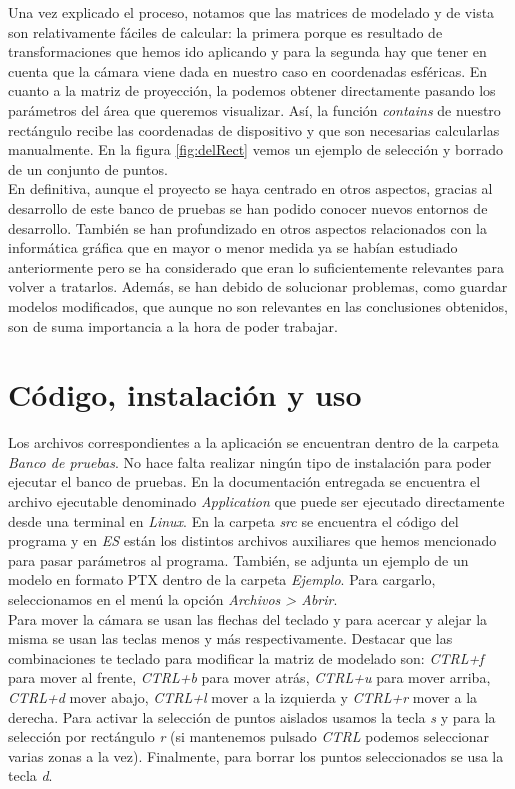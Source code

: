 Una vez explicado el proceso, notamos que las matrices de modelado y de vista son relativamente fáciles de calcular: la primera porque es resultado de transformaciones que hemos ido aplicando y para la segunda hay que tener en cuenta que la cámara viene dada en nuestro caso en coordenadas esféricas. En cuanto a la matriz de proyección, la podemos obtener directamente pasando los parámetros del área que queremos visualizar. Así, la función \textit{contains} de nuestro rectángulo recibe las coordenadas de dispositivo y que son necesarias calcularlas manualmente. En la figura \ref{fig:delRect} vemos un ejemplo de selección y borrado de un conjunto de puntos. \\

En definitiva, aunque el proyecto se haya centrado en otros aspectos, gracias al desarrollo de este banco de pruebas se han podido conocer nuevos entornos de desarrollo. También se han profundizado en otros aspectos relacionados con la informática  gráfica que en mayor o menor medida ya se habían estudiado anteriormente pero se ha considerado que eran lo suficientemente relevantes para volver a tratarlos. Además, se han debido de solucionar problemas, como guardar modelos modificados, que aunque no son relevantes en las conclusiones obtenidos, son de suma importancia a la hora de poder trabajar.


\section{Código, instalación y uso}
Los archivos correspondientes a la aplicación se encuentran dentro de la carpeta \textit{Banco de pruebas}. No hace falta realizar ningún tipo de instalación para poder ejecutar el banco de pruebas. En la documentación entregada se encuentra el archivo ejecutable denominado \textit{Application} que puede ser ejecutado directamente desde una terminal en \textit{Linux}. En la carpeta \textit{src} se encuentra el código del programa y en \textit{ES} están los distintos archivos auxiliares que hemos mencionado para pasar parámetros al programa. También, se adjunta un ejemplo de un modelo en formato PTX dentro de la carpeta \textit{Ejemplo}. Para cargarlo, seleccionamos en el menú la opción \textit{Archivos > Abrir}.\\

Para mover la cámara se usan las flechas del teclado y para acercar y alejar la misma se usan las teclas menos y más respectivamente. Destacar que las combinaciones te teclado para modificar la matriz de modelado son: \textit{CTRL+f} para mover al frente, \textit{CTRL+b} para mover atrás, \textit{CTRL+u} para mover arriba, \textit{CTRL+d} mover abajo, \textit{CTRL+l} mover a la izquierda y \textit{CTRL+r} mover a la derecha. Para activar la selección de puntos aislados usamos la tecla \textit{s} y para la selección por rectángulo \textit{r} (si mantenemos pulsado \textit{CTRL} podemos seleccionar varias zonas a la vez). Finalmente, para borrar los puntos seleccionados se usa la tecla \textit{d}. 




